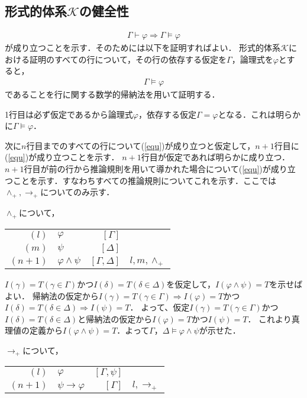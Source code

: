 \documentclass[10pt,b5paper,papersize,dvipdfmx]{jsbook}
\begin{document}
\subsection{形式的体系\texorpdfstring{$\mathcal K$}{K}の健全性}
\begin{align}
  \Gamma \vdash \varphi \Rightarrow \Gamma \models \varphi
\end{align}
が成り立つことを示す．そのためには以下を証明すればよい．
形式的体系$\mathcal K$における証明のすべての行について，その行の依存する仮定を$\Gamma$，論理式を$\varphi$とすると，
\begin{align}
  \label{equ} \Gamma \models \varphi
\end{align}
であることを行に関する数学的帰納法を用いて証明する．\par
1行目は必ず仮定であるから論理式$\varphi$，依存する仮定$\Gamma = \varphi$となる．これは明らかに$\Gamma \models \varphi$． \par
次に$n$行目までのすべての行について(\ref{equ})が成り立つと仮定して，$n+1$行目に(\ref{equ})が成り立つことを示す．
$n+1$行目が仮定であれば明らかに成り立つ．$n+1$行目が前の行から推論規則を用いて導かれた場合について(\ref{equ})が成り立つことを示す．すなわちすべての推論規則についてこれを示す．ここでは$\land_+, \to_+$についてのみ示す．\par
$\land_+$について，
\begin{table}[H]
  \begin{tabular}{rlrl}
    $(l)$&$\varphi$&$[\Gamma]$& \\
    $(m)$&$\psi$&$[\Delta]$& \\
    $(n+1)$&$\varphi \land \psi$&$[\Gamma,\Delta]$&$l,m,\land_+$
  \end{tabular}
\end{table}
$I(\gamma)=T(\gamma \in \Gamma)$かつ$I(\delta)=T(\delta \in \Delta)$を仮定して，$I(\varphi \land \psi)=T$を示せばよい．
帰納法の仮定から$I(\gamma)=T(\gamma \in \Gamma)\Rightarrow I(\varphi)=T$かつ$I(\delta)=T(\delta \in \Delta)\Rightarrow I(\psi)=T$．
よって、仮定$I(\gamma)=T(\gamma \in \Gamma)$かつ$I(\delta)=T(\delta \in \Delta)$と帰納法の仮定から$I(\varphi)=T$かつ$I(\psi)=T$．
これより真理値の定義から$I(\varphi \land \psi)=T$．よって$\Gamma，\Delta \models \varphi \land \psi$が示せた．\par
$\to_+$について，
\begin{table}[H]
  \begin{tabular}{rlrl}
    $(l)$&$\varphi$&$[\Gamma,\psi]$& \\
    $(n+1)$&$\psi \to \varphi$&$[\Gamma]$&$l,\to_+$ \\
  \end{tabular}
\end{table}
\end{document}
